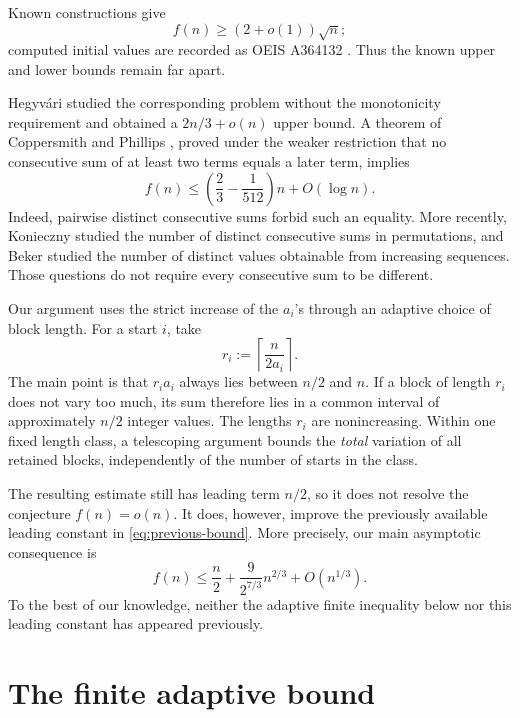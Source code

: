 \documentclass[11pt]{article}
\numberwithin{equation}{section}
\theoremstyle{remark}
\newcommand{\ceil}[1]{\left\lceil #1\right\rceil}
\begin{document}
Known constructions give \cite{ErdosProblems357}
\[
  f(n)\geq (2+o(1))\sqrt n;
\]
computed initial values are recorded as OEIS A364132
\cite{OEISA364132}.  Thus the known upper and lower bounds remain far
apart.

Hegyv\'ari \cite{Hegyvari1986} studied the corresponding problem
without the monotonicity requirement and obtained a \(2n/3+o(n)\)
upper bound.  A theorem of Coppersmith and Phillips
\cite{CoppersmithPhillips1996}, proved under the weaker restriction
that no consecutive sum of at least two terms equals a later term,
implies
\begin{equation}
  f(n)\leq
  \left(\frac23-\frac1{512}\right)n+O(\log n).
  \label{eq:previous-bound}
\end{equation}
Indeed, pairwise distinct consecutive sums forbid such an equality.
More recently, Konieczny \cite{Konieczny2021} studied the number of
distinct consecutive sums in permutations, and Beker
\cite{Beker2024} studied the number of distinct values obtainable from
increasing sequences.  Those questions do not require every
consecutive sum to be different.

Our argument uses the strict increase of the \(a_i\)'s through an
adaptive choice of block length.  For a start \(i\), take
\begin{equation}
  r_i:=\ceil{\frac{n}{2a_i}}.
  \label{eq:adaptive-length}
\end{equation}
The main point is that \(r_i a_i\) always lies between \(n/2\) and
\(n\).  If a block of length \(r_i\) does not vary too much, its sum
therefore lies in a common interval of approximately \(n/2\) integer
values.  The lengths \(r_i\) are nonincreasing.  Within one fixed
length class, a telescoping argument bounds the \emph{total} variation
of all retained blocks, independently of the number of starts in the
class.

The resulting estimate still has leading term \(n/2\), so it does not
resolve the conjecture \(f(n)=o(n)\).  It does, however, improve the
previously available leading constant in \eqref{eq:previous-bound}.
More precisely, our main asymptotic consequence is
\[
  f(n)\leq \frac n2+\frac{9}{2^{7/3}}n^{2/3}+O(n^{1/3}).
\]
To the best of our knowledge, neither the adaptive finite inequality
below nor this leading constant has appeared previously.

\section{The finite adaptive bound}
\end{document}
